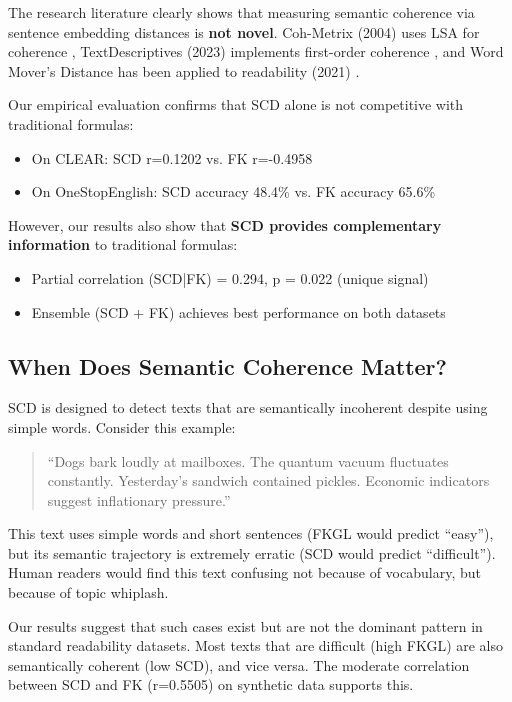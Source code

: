 \documentclass[11pt,letterpaper]{article}
\begin{document}
The research literature clearly shows that measuring semantic coherence via sentence embedding distances is \textbf{not novel}. Coh-Metrix (2004) uses LSA for coherence \cite{Graesser2011}, TextDescriptives (2023) implements first-order coherence \cite{Hlasse2023}, and Word Mover's Distance has been applied to readability (2021) \cite{Imperial2021WMD}.

Our empirical evaluation confirms that SCD alone is not competitive with traditional formulas:
\begin{itemize}
  \item On CLEAR: SCD r=0.1202 vs. FK r=-0.4958
  \item On OneStopEnglish: SCD accuracy 48.4\% vs. FK accuracy 65.6\%
\end{itemize}

However, our results also show that \textbf{SCD provides complementary information} to traditional formulas:
\begin{itemize}
  \item Partial correlation (SCD|FK) = 0.294, p = 0.022 (unique signal)
  \item Ensemble (SCD + FK) achieves best performance on both datasets
\end{itemize}

\subsection{When Does Semantic Coherence Matter?}

SCD is designed to detect texts that are semantically incoherent despite using simple words. Consider this example:

\begin{quote}
``Dogs bark loudly at mailboxes. The quantum vacuum fluctuates constantly. Yesterday's sandwich contained pickles. Economic indicators suggest inflationary pressure.''
\end{quote}

This text uses simple words and short sentences (FKGL would predict ``easy''), but its semantic trajectory is extremely erratic (SCD would predict ``difficult''). Human readers would find this text confusing not because of vocabulary, but because of topic whiplash.

Our results suggest that such cases exist but are not the dominant pattern in standard readability datasets. Most texts that are difficult (high FKGL) are also semantically coherent (low SCD), and vice versa. The moderate correlation between SCD and FK (r=0.5505) on synthetic data supports this.
\end{document}
